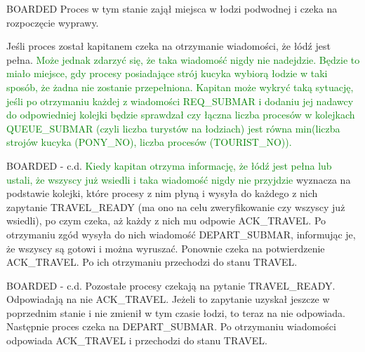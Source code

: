 \documentclass{beamer}
\begin{document}
\begin{frame}{BOARDED}
    \internallinenumbers
    \resetlinenumber[1]
    Proces w tym stanie zajął miejsca w łodzi podwodnej i czeka na rozpoczęcie wyprawy.

    \vspace{0.4cm}
    Jeśli proces został kapitanem czeka na otrzymanie wiadomości, że łódź jest pełna.
    \textcolor{green}{Może jednak zdarzyć się, że taka wiadomość nigdy nie nadejdzie. Będzie to miało miejsce, gdy procesy posiadające strój kucyka wybiorą łodzie w taki sposób, że żadna nie zostanie przepełniona. Kapitan może wykryć taką sytuację, jeśli po otrzymaniu każdej z wiadomości REQ\_SUBMAR i dodaniu jej nadawcy do odpowiedniej kolejki będzie sprawdzał czy łączna liczba procesów w kolejkach QUEUE\_SUBMAR (czyli liczba turystów na łodziach) jest równa min(liczba strojów kucyka (PONY\_NO), liczba procesów (TOURIST\_NO)).}
\end{frame}

\begin{frame}{BOARDED - c.d.}
    \internallinenumbers
    \resetlinenumber[1]
    \textcolor{green}{Kiedy kapitan otrzyma informację, że łódź jest pełna lub ustali, że wszyscy już wsiedli i taka wiadomość nigdy nie przyjdzie} wyznacza na podstawie kolejki, które procesy z nim płyną i wysyła do każdego z nich zapytanie TRAVEL\_READY (ma ono na celu zweryfikowanie czy wszyscy już wsiedli), po czym czeka, aż każdy z nich mu odpowie ACK\_TRAVEL. Po otrzymaniu zgód wysyła do nich wiadomość DEPART\_SUBMAR, informując je, że wszyscy są gotowi i można wyruszać. Ponownie czeka na potwierdzenie ACK\_TRAVEL. Po ich otrzymaniu przechodzi do stanu TRAVEL.
\end{frame}

\begin{frame}{BOARDED - c.d.}
    \internallinenumbers
    \resetlinenumber[1]
    Pozostałe procesy czekają na pytanie TRAVEL\_READY. Odpowiadają na nie ACK\_TRAVEL. Jeżeli to zapytanie uzyskał jeszcze w poprzednim stanie i nie zmienił w tym czasie łodzi, to teraz na nie odpowiada. \\
    Następnie proces czeka na DEPART\_SUBMAR. Po otrzymaniu wiadomości odpowiada ACK\_TRAVEL i przechodzi do stanu TRAVEL.
\end{frame}
\end{document}
